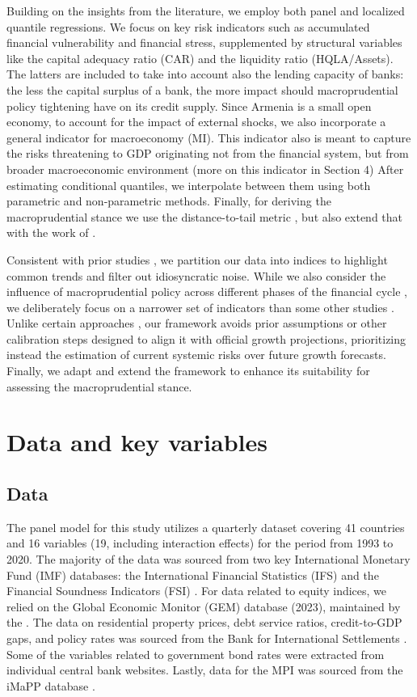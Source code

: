 \documentclass[12pt,a4paper]{article}
\begin{document}
Building on the insights from the literature, we employ both panel and localized quantile regressions. We focus on key risk indicators such as accumulated financial vulnerability and financial stress, supplemented by structural variables like the capital adequacy ratio (CAR) and the liquidity ratio (HQLA/Assets). The latters are included to take into account also the lending capacity of banks: the less the capital surplus of a bank, the more impact should macroprudential policy tightening have on its credit supply. Since Armenia is a small open economy, to account for the impact of external shocks, we also incorporate a general indicator for macroeconomy (MI). This indicator also is meant to capture the risks threatening to GDP originating not from the financial system, but from broader macroeconomic environment (more on this indicator in Section 4) After estimating conditional quantiles, we interpolate between them using both parametric and non-parametric methods. Finally, for deriving the macroprudential stance we use the distance-to-tail metric \citep{esrb2024}, but also extend that with the work of \citet{suarez2022}.

Consistent with prior studies \citep{imf_gar_2019}, we partition our data into indices to highlight common trends and filter out idiosyncratic noise. While we also consider the influence of macroprudential policy across different phases of the financial cycle \citep{galan2020}, we deliberately focus on a narrower set of indicators than some other studies \citep{aikman2019}. Unlike certain approaches \citep{szabo2020}, our framework avoids prior assumptions or other calibration steps designed to align it with official growth projections, prioritizing instead the estimation of current systemic risks over future growth forecasts.  Finally, we adapt and extend the framework to enhance its suitability for assessing the macroprudential stance.

\section{Data and key variables}
\subsection{Data}
The panel model for this study utilizes a quarterly dataset covering 41 countries and 16 variables (19, including interaction effects) for the period from 1993 to 2020. The majority of the data was sourced from two key International Monetary Fund (IMF) databases: the International Financial Statistics (IFS) and the Financial Soundness Indicators (FSI) \citep{ifs2024, fsi2024}. For data related to equity indices, we relied on the Global Economic Monitor (GEM) database (2023), maintained by the \citet{gem2024}. The data on residential property prices, debt service ratios, credit-to-GDP gaps, and policy rates was sourced from the Bank for International Settlements \citep{RPP, DSR, CREDIT_GAPS, CBPOL}. Some of the variables related to government bond rates were extracted from individual central bank websites. Lastly, data for the MPI was sourced from the iMaPP database \citep{alam2019}.
\end{document}
